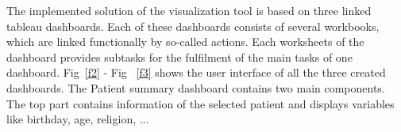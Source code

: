 \documentclass[aac,crcready]{iosart2x}
\begin{document}
The implemented solution of the visualization tool is based on three linked tableau dashboards. Each of these dashboards consists of several workbooks, which are linked functionally by so-called actions. Each worksheets of the dashboard provides subtasks for the fulfilment of the main tasks of one dashboard. Fig~\ref{f2} - Fig ~\ref{f3} shows the user interface of all the three created dashboards.
The Patient summary dashboard contains two main components. The top part contains information of the selected patient and displays variables like birthday, age, religion, ...

\end{document}
